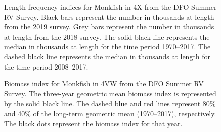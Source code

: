 \documentclass[11pt]{book}
\begin{document}
\begin{figure}[htb]

{\centering {} 

}

\caption{Length frequency indices for Monkfish in 4X from the DFO Summer RV Survey. Black bars represent the number in thousands at length from the 2019 survey. Grey bars represent the number in thousands at length from the 2018 survey. The solid black line represents the median in thousands at length for the time period 1970--2017. The dashed black line represents the median in thousands at length for the time period 2008--2017.}\label{fig:72-fig-monkfish-lengthfreq4X}
\end{figure}

\begin{figure}[htb]

{\centering {} 

}

\caption{Biomass index for Monkfish in 4VW from the DFO Summer RV Survey. The three-year geometric mean biomass index is represented by the solid black line. The dashed blue and red lines represent 80\% and 40\% of the long-term geometric mean (1970--2017), respectively. The black dots represent the biomass index for that year.}\label{fig:73-fig-monkfish-biomass4VW}
\end{figure}
\end{document}
